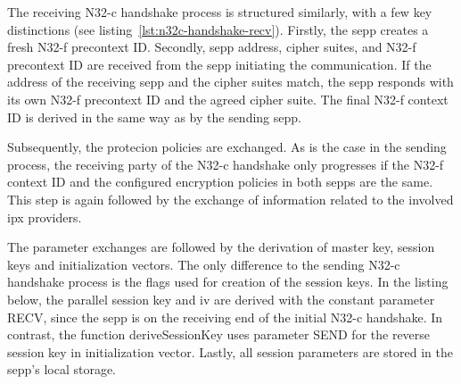 The receiving N32-c handshake process is structured similarly, with a few key distinctions (see listing~\ref{lst:n32c-handshake-recv}).
Firstly, the \gls{sepp} creates a fresh N32-f precontext ID.
Secondly, \gls{sepp} address, cipher suites, and N32-f precontext ID are received from the \gls{sepp} initiating the communication.
If the address of the receiving \gls{sepp} and the cipher suites match, the \gls{sepp} responds with its own N32-f precontext ID and the agreed cipher suite.
The final N32-f context ID is derived in the same way as by the sending \gls{sepp}.

Subsequently, the protecion policies are exchanged.
As is the case in the sending process, the receiving party of the N32-c handshake only progresses if the N32-f context ID and the configured encryption policies in both \glspl{sepp} are the same.
This step is again followed by the exchange of information related to the involved \gls{ipx} providers.

The parameter exchanges are followed by the derivation of master key, session keys and initialization vectors.
The only difference to the sending N32-c handshake process is the flags used for creation of the session keys.
In the listing below, the parallel session key and \gls{iv} are derived with the constant parameter {\sffamily RECV}, since the \gls{sepp} is on the receiving end of the initial N32-c handshake.
In contrast, the function {\sffamily deriveSessionKey} uses parameter {\sffamily SEND} for the reverse session key in initialization vector.
Lastly, all session parameters are stored in the \gls{sepp}'s local storage.

